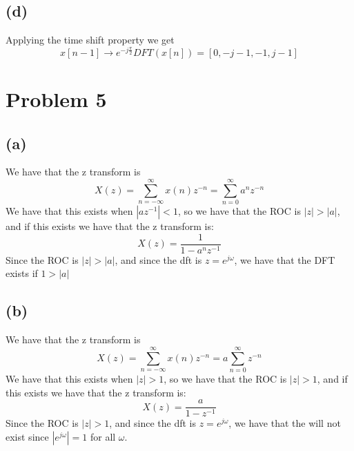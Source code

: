 \subsection*{(d)}
Applying the time shift property we get
$$x[n-1]\to e^{-j\frac{\pi}{2}}DFT(x[n])=[0,-j-1,-1,j-1]$$
\section*{Problem 5}
\subsection*{(a)}
We have that the z transform is 
$$X(z)=\sum_{n=-\infty}^{\infty}x(n)z^{-n}=\sum_{n=0}^{\infty}a^{n}z^{-n}$$
We have that this exists when $|az^{-1}|<1$, so we have that
the ROC is $|z|>|a|$, and if this exists we have that 
the z transform is:
$$X(z)=\frac{1}{1-a^{n}z^{-1}}$$
Since the ROC is $|z|>|a|$, and since the 
dft is $z=e^{j\omega}$, we have that the DFT exists if 
$1>|a|$
\subsection*{(b)}
We have that the z transform is
$$X(z)=\sum_{n=-\infty}^{\infty}x(n)z^{-n}=a\sum_{n=0}^{\infty}z^{-n}$$
We have that this exists when $|z|>1$, so we have that
the ROC is $|z|>1$, and if this exists we have that
the z transform is:
$$X(z)=\frac{a}{1-z^{-1}}$$
Since the ROC is $|z|>1$, and since the
dft is $z=e^{j\omega}$, we have that the  will not
exist since $|e^{j\omega}|=1$ for all $\omega$.

